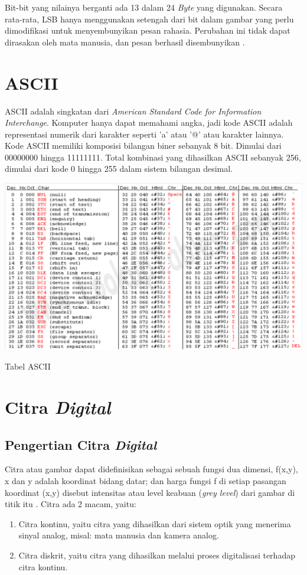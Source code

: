 Bit-bit yang nilainya berganti ada 13 dalam 24 \emph{Byte} yang digunakan. Secara rata-rata, LSB hanya menggunakan setengah dari bit dalam gambar yang perlu dimodifikasi untuk menyembunyikan pesan rahasia. Perubahan ini tidak dapat dirasakan oleh mata manusia, dan pesan berhasil disembunyikan \cite{elgabar2}.

\section{ASCII}
ASCII adalah singkatan dari \emph{American Standard Code for Information Interchange}. Komputer hanya dapat memahami angka, jadi kode ASCII adalah representasi numerik dari karakter seperti 'a' atau '@' atau karakter lainnya. Kode ASCII memiliki komposisi bilangan biner sebanyak 8 bit. Dimulai dari 00000000 hingga 11111111. Total kombinasi yang dihasilkan ASCII sebanyak 256, dimulai dari kode 0 hingga 255 dalam sistem bilangan desimal. \cite{ascii}
\begin{table}[H]
	\centering
	\includegraphics[width=1.0\textwidth]{gambar/table_ascii}
	\caption{Tabel ASCII}
	\label{tabel_ascii}
\end{table}

\section{Citra \emph{Digital}}
	\subsection{Pengertian Citra \emph{Digital}}
	Citra atau gambar dapat didefinisikan sebagai sebuah fungsi dua dimensi, f(x,y), x dan y adalah koordinat bidang datar; dan harga fungsi f di setiap pasangan koordinat (x,y) disebut intensitas atau level keabuan (\emph{grey level}) dari gambar di titik itu \cite{hermawati}. Citra ada 2 macam, yaitu:
	\begin{enumerate}
		\item Citra kontinu, yaitu citra yang dihasilkan dari sistem optik yang menerima sinyal analog, misal: mata manusia dan kamera analog.
		\item Citra diskrit, yaitu citra yang dihasilkan melalui proses digitalisasi terhadap citra kontinu.
	\end{enumerate}
	
